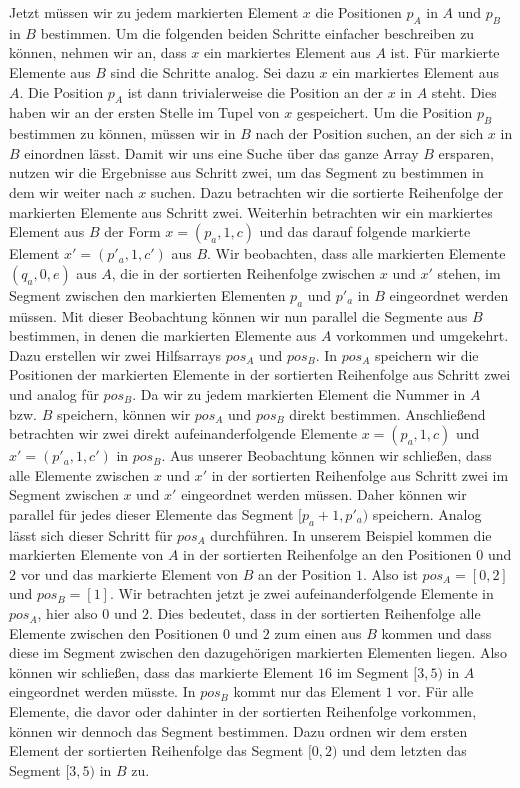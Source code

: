 Jetzt müssen wir zu jedem markierten Element $x$ die Positionen $p_A$ in $A$ und $p_B$ in $B$ bestimmen. Um die folgenden beiden Schritte einfacher beschreiben zu können, nehmen wir an, dass $x$ ein markiertes Element aus $A$ ist. Für markierte Elemente aus $B$ sind die Schritte analog.
Sei dazu $x$ ein markiertes Element aus $A$. Die Position $p_A$ ist dann trivialerweise die Position an der $x$ in $A$ steht. Dies haben wir an der ersten Stelle im Tupel von $x$ gespeichert. Um die Position $p_B$ bestimmen zu können, müssen wir in $B$ nach der Position suchen, an der sich $x$ in $B$ einordnen lässt. Damit wir uns eine Suche über das ganze Array $B$ ersparen, nutzen wir die Ergebnisse aus Schritt zwei, um das Segment zu bestimmen in dem wir weiter nach $x$ suchen. 
Dazu betrachten wir die sortierte Reihenfolge der markierten Elemente aus Schritt zwei. Weiterhin betrachten wir ein markiertes Element aus $B$ der Form $x = (p_a, 1, c)$ und das darauf folgende markierte Element $x' = (p'_a, 1, c')$ aus $B$. Wir beobachten, dass alle markierten Elemente $(q_a, 0, e)$ aus $A$, die in der sortierten Reihenfolge zwischen $x$ und $x'$ stehen, im Segment zwischen den markierten Elementen $p_a$ und $p'_a$ in $B$ eingeordnet werden müssen. Mit dieser Beobachtung können wir nun parallel die Segmente aus $B$ bestimmen, in denen die markierten Elemente aus $A$ vorkommen und umgekehrt. 
Dazu erstellen wir zwei Hilfsarrays $pos_A$ und $pos_B$. In $pos_A$ speichern wir die Positionen der markierten Elemente in der sortierten Reihenfolge aus Schritt zwei und analog für $pos_B$. Da wir zu jedem markierten Element die Nummer in $A$ bzw. $B$ speichern, können wir $pos_A$ und $pos_B$ direkt bestimmen. Anschließend betrachten wir zwei direkt aufeinanderfolgende Elemente $x=(p_a, 1, c)$ und $x'=(p'_a, 1, c')$ in $pos_B$. Aus unserer Beobachtung können wir schließen, dass alle Elemente zwischen $x$ und $x'$ in der sortierten Reihenfolge aus Schritt zwei im Segment zwischen $x$ und $x'$ eingeordnet werden müssen. Daher können wir parallel für jedes dieser Elemente das Segment $[p_a+1, p'_a)$ speichern. Analog lässt sich dieser Schritt für $pos_A$ durchführen.
In unserem Beispiel kommen die markierten Elemente von $A$ in der sortierten Reihenfolge an den Positionen $0$ und $2$ vor und das markierte Element von $B$ an der Position $1$. Also ist $pos_A = [0,2]$ und $pos_B = [1]$. Wir betrachten jetzt je zwei aufeinanderfolgende Elemente in $pos_A$, hier also $0$ und $2$. Dies bedeutet, dass in der sortierten Reihenfolge alle Elemente zwischen den Positionen $0$ und $2$ zum einen aus $B$ kommen und dass diese im Segment zwischen den dazugehörigen markierten Elementen liegen. Also können wir schließen, dass das markierte Element $16$ im Segment $[3, 5)$ in $A$ eingeordnet werden müsste. In $pos_B$ kommt nur das Element $1$ vor. Für alle Elemente, die davor oder dahinter in der sortierten Reihenfolge vorkommen, können wir dennoch das Segment bestimmen. Dazu ordnen wir dem ersten Element der sortierten Reihenfolge das Segment $[0,2)$ und dem letzten das Segment $[3,5)$ in $B$ zu.

